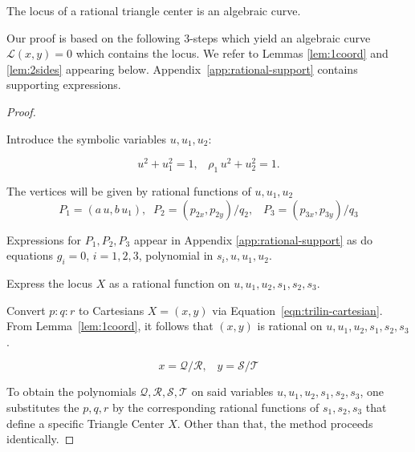 \begin{theorem}
The locus of a rational triangle center is an algebraic curve.
\label{thm:rational-center}
\end{theorem}

Our proof is based on the following 3-steps which yield an algebraic curve $\mathcal{L}(x,y)=0$ which contains the locus. We refer to Lemmas \ref{lem:1coord} and \ref{lem:2sides} appearing below. Appendix~\ref{app:rational-support} contains  supporting expressions.

\begin{proof}

\begin{step}
Introduce the symbolic variables $u, u_1, u_2$:

\begin{equation*}
    u^2 + u_1^2 = 1,\;\;\;\rho_1\, u^2 + u_2^2 = 1.
\end{equation*} %

\end{step}
 
\noindent The vertices will be given by rational functions of   $u, u_1, u_2$ 
\begin{equation*} P_1 = (a\,u, b\,u_1),\;\;P_2 = (p_{2x}, p_{2y})/q_2,\;\;\;P_3 = (p_{3x}, p_{3y})/q_3 
\end{equation*}
 
\noindent Expressions for $P_1,P_2,P_3$ appear in Appendix \ref{app:rational-support} as do equations $g_i=0$, $i=1,2,3$, polynomial in $ s_i,u,u_1,u_2$.
 
\begin{step}Express the locus  $X$ as a  rational function on  $u,u_1, u_2, s_1, s_2, s_3$.
\end{step}

Convert $p:q:r$ to Cartesians $ X = (x,y)$ via Equation~\eqref{eqn:trilin-cartesian}. From Lemma~\ref{lem:1coord}, it follows that
$\left(x,y\right)$ is rational on $u,u_1,u_2,s_1,s_2,s_3$.

\begin{equation*} x=\mathcal{Q}/\mathcal{R},\;\;\;y=\mathcal{S}/\mathcal{T}
\end{equation*}

\noindent To obtain the polynomials    $\mathcal{Q,R,S,T}$  on said variables $u,u_1,u_2,s_1,s_2,s_3$,
 one substitutes the 
$p,q,r$ by the corresponding rational functions of  $s_1, s_2, s_3$ that define a specific Triangle Center $X$. Other than that, the method proceeds identically.


\end{proof}
